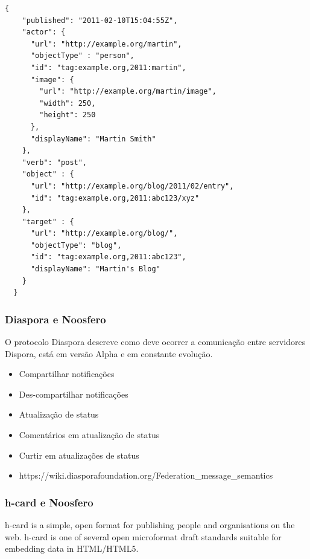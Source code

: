 \documentclass[12pt]{article}
\begin{document}
\begin{framed}
\begin{lstlisting}[caption=Exemplo simples de atividade JSON serielizada]
  {
    "published": "2011-02-10T15:04:55Z",
    "actor": {
      "url": "http://example.org/martin",
      "objectType" : "person",
      "id": "tag:example.org,2011:martin",
      "image": {
        "url": "http://example.org/martin/image",
        "width": 250,
        "height": 250
      },
      "displayName": "Martin Smith"
    },
    "verb": "post",
    "object" : {
      "url": "http://example.org/blog/2011/02/entry",
      "id": "tag:example.org,2011:abc123/xyz"
    },
    "target" : {
      "url": "http://example.org/blog/",
      "objectType": "blog",
      "id": "tag:example.org,2011:abc123",
      "displayName": "Martin's Blog"
    }
  }
\end{lstlisting}
\end{framed}

\subsubsection{Diaspora e Noosfero}

O protocolo Diaspora descreve como deve ocorrer a comunicação entre servidores
Dispora, está em versão Alpha e em constante evolução.

\begin{itemize}
  \item Compartilhar notificações
  \item Des-compartilhar notificações
  \item Atualização de status
  \item Comentários em atualização de status
  \item Curtir em atualizações de status
\end{itemize}

\begin{itemize}
  \item https://wiki.diasporafoundation.org/Federation\_message\_semantics
\end{itemize}

\subsubsection{h-card e Noosfero}

h-card is a simple, open format for publishing people and organisations on the web. h-card is one of several open microformat draft standards suitable for embedding data in HTML/HTML5.
\end{document}
